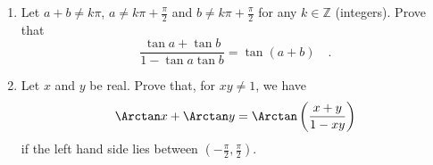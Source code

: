 \begin{enumerate}[ref={\fcProblemRef}]
\item \label{problemTangentAngleSumLaw}  Let $a+b\neq k\pi $, $a\neq k\pi+\frac{\pi}{2}$ and $b\neq k\pi +\frac{\pi}{2}$ for any $k\in \mathbb Z$ (integers). Prove that
\[
\frac{\tan a + \tan b}{1-\tan a \tan b }= \tan (a+b)\quad .
\]
\item \label{problemArctangentAngleSumLaw} Let $x$ and $y$ be real. Prove that, for $xy\neq 1$, we have
\[\Arctan x+\Arctan y= \Arctan\left( \frac{x+y}{1-xy}\right)
\]
if the left hand side lies between $\left(-\frac{\pi}{2}, \frac{\pi}{2}\right)$.
\end{enumerate}
